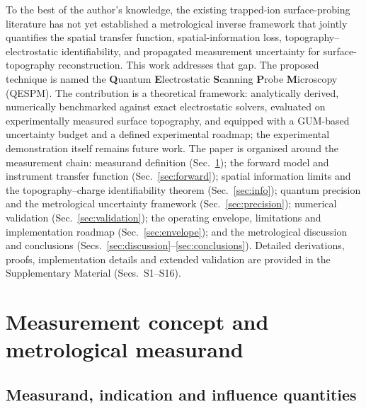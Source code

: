 \documentclass[12pt,a4paper]{article}
\begin{document}
To the best of the author's knowledge, the existing trapped-ion
surface-probing literature has not yet established a metrological inverse
framework that jointly quantifies the spatial transfer function,
spatial-information loss, topography--electrostatic identifiability, and
propagated measurement uncertainty for surface-topography reconstruction.
This work addresses that gap.  The proposed technique is named the \textbf{Q}uantum
\textbf{E}lectrostatic \textbf{S}canning \textbf{P}robe
\textbf{M}icroscopy (QESPM).  The contribution is a theoretical framework:
analytically derived, numerically benchmarked against exact
electrostatic solvers, evaluated on experimentally measured surface
topography, and equipped with a GUM-based uncertainty budget and a defined
experimental roadmap; the experimental demonstration itself remains future
work.  The paper is organised around the measurement chain: measurand
definition (Sec.~\ref{sec:concept}); the forward model and instrument
transfer function (Sec.~\ref{sec:forward}); spatial information limits and
the topography--charge identifiability theorem (Sec.~\ref{sec:info});
quantum precision and the metrological uncertainty framework
(Sec.~\ref{sec:precision}); numerical validation
(Sec.~\ref{sec:validation}); the operating envelope, limitations and
implementation roadmap (Sec.~\ref{sec:envelope}); and the metrological
discussion and conclusions (Secs.~\ref{sec:discussion}--\ref{sec:conclusions}).
Detailed derivations, proofs, implementation details and extended
validation are provided in the Supplementary Material (Secs.~S1--S16).

\section{Measurement concept and metrological measurand}
\label{sec:concept}

\subsection{Measurand, indication and influence quantities}
\end{document}
